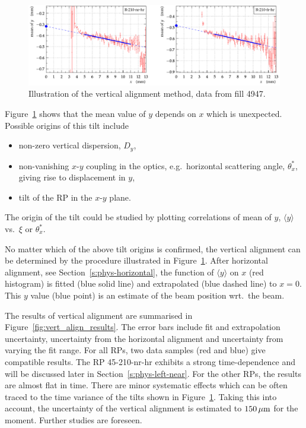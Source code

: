\documentclass[TOTEM]{cern/cernphprep}
\def\un#1{\,{\rm #1}}
\begin{document}
\begin{figure}[h!]
\begin{center}
\includegraphics[width=0.8\hsize]{fig/physics_fills/y_alignment_method_example.pdf}
\caption{%
Illustration of the vertical alignment method, data from fill 4947.
}
\label{fig:vert_align_method}
\end{center}
\end{figure}



Figure~\ref{fig:vert_align_method} shows that the mean value of $y$ depends on $x$ which is unexpected. Possible origins of this tilt include
\begin{itemize}[nosep]
\item non-zero vertical dispersion, $D_y$,
\item non-vanishing $x$-$y$ coupling in the optics, e.g.~horizontal scattering angle, $\theta_x^*$, giving rise to displacement in $y$,
\item tilt of the RP in the $x$-$y$ plane.
\end{itemize}
The origin of the tilt could be studied by plotting correlations of mean of $y$, $\langle y\rangle$ vs.~$\xi$ or $\theta_x^*$.

No matter which of the above tilt origins is confirmed, the vertical alignment can be determined by the procedure illustrated in Figure~\ref{fig:vert_align_method}. After horizontal alignment, see Section~\ref{s:phys-horizontal}, the function of $\langle y\rangle$ on $x$ (red histogram) is fitted (blue solid line) and extrapolated (blue dashed line) to $x = 0$. This $y$ value (blue point) is an estimate of the beam position wrt.~the beam.

The results of vertical alignment are summarised in Figure~\ref{fig:vert_align_results}. The error bars include fit and extrapolation uncertainty, uncertainty from the horizontal alignment and uncertainty from varying the fit range. For all RPs, two data samples (red and blue) give compatible results. The RP 45-210-nr-hr exhibits a strong time-dependence and will be discussed later in Section~\ref{s:phys-left-near}. For the other RPs, the results are almost flat in time. There are minor systematic effects which can be often traced to the time variance of the tilts shown in Figure~\ref{fig:vert_align_method}. Taking this into account, the uncertainty of the vertical alignment is estimated to $150\un{\mu m}$ for the moment. Further studies are foreseen.
\end{document}
